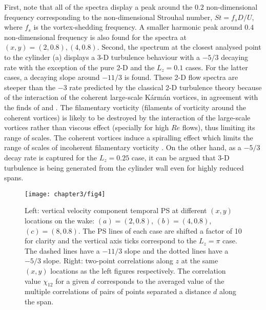 \documentclass[../main.tex]{subfiles}
\begin{document}
First, note that all of the spectra display a peak around the $0.2$ non-dimensional frequency corresponding to the non-dimensional Strouhal number, $St=f_s D/U$, where $f_s$ is the vortex-shedding frequency.
A smaller harmonic peak around $0.4$ non-dimensional frequency is also found for the spectra at $(x,y)=(2,0.8),(4,0.8)$.
Second, the spectrum at the closest analysed point to the cylinder (a) displays a 3-D turbulence behaviour with a $-5/3$ decaying rate with the exception of the pure 2-D and the $L_z=0.1$ cases.
For the latter cases, a decaying slope around $-11/3$ is found.
These 2-D flow spectra are steeper than the $-3$ rate predicted by the classical 2-D turbulence theory \citep{Kraichnan1967} because of the interaction of the coherent large-scale K\'{a}rm\'{a}n vortices, in agreement with the finds of \cite{Dritschel2008} and \cite{Biancofiore2014}.
The filamentary vorticity (filaments of vorticity around the coherent vortices) is likely to be destroyed by the interaction of the large-scale vortices rather than viscous effect (specially for high $Re$ flows), thus limiting its range of scales.
The coherent vortices induce a spiralling effect which limits the range of scales of incoherent filamentary vorticity \citep{Gilbert1988}.
On the other hand, as a $-5/3$ decay rate is captured for the $L_z=0.25$ case, it can be argued that 3-D turbulence is being generated from the cylinder wall even for highly reduced spans.

\begin{figure}
	\vspace*{0.3cm}
  \centerline{\texttt{[image: chapter3/fig4]}}
  \caption{Left: vertical velocity component temporal PS at different $\left(x,y\right)$ locations on the wake: $\left(a\right)=\left(2,0.8\right)$, $\left(b\right)=\left(4,0.8\right)$, $\left(c\right)=\left(8,0.8\right)$.
The PS lines of each case are shifted a factor of 10 for clarity and the vertical axis ticks correspond to the $L_z=\pi$ case.
The dashed lines have a $-11/3$ slope and the dotted lines have a $-5/3$ slope.
Right: two-point correlations along $z$ at the same $(x,y)$ locations as the left figures respectively.
The correlation value $\chi_{12}$ for a given $d$ corresponds to the averaged value of the multiple correlations of pairs of points separated a distance $d$ along the span.}
\label{fig:velocity_spectras}
\end{figure}
\end{document}
